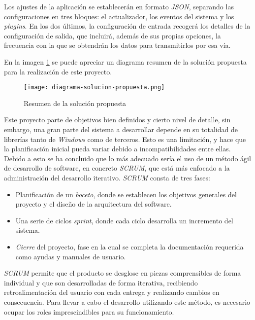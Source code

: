     Los ajustes de la aplicación se establecerán en formato \textit{JSON}, separando las configuraciones en tres bloques: el actualizador, los eventos del sistema y los \textit{plugins}. En los dos últimos, la configuración de entrada recogerá los detalles de la configuración de salida, que incluirá, además de sus propias opciones, la frecuencia con la que se obtendrán los datos para transmitirlos por esa vía.
    
    En la imagen \ref{fig:proposed-solution-diagram} se puede apreciar un diagrama resumen de la solución propuesta para la realización de este proyecto.
    
    \begin{figure}[h!]
    \centering
        \texttt{[image: diagrama-solucion-propuesta.png]}
        \caption{Resumen de la solución propuesta}
        \label{fig:proposed-solution-diagram}
    \end{figure}
    
    Este proyecto parte de objetivos bien definidos y cierto nivel de detalle, sin embargo, una gran parte del sistema a desarrollar depende en su totalidad de librerías tanto de \textit{Windows} como de terceros. Esto es una limitación, y hace que la planificación inicial pueda variar debido a incompatibilidades entre ellas. Debido a esto se ha concluido que lo más adecuado sería el uso de un método ágil de desarrollo de software, en concreto \textit{SCRUM}, que está más enfocado a la administración del desarrollo iterativo. \textit{SCRUM} consta de tres fases:
        
    \begin{itemize}
        \item Planificación de un \textit{boceto}, donde se establecen los objetivos generales del proyecto y el diseño de la arquitectura del software.
        
        \item Una serie de ciclos \textit{sprint}, donde cada ciclo desarrolla un incremento del sistema.
        
        \item \textit{Cierre} del proyecto, fase en la cual se completa la documentación requerida como ayudas y manuales de usuario.
    \end{itemize}

    \textit{SCRUM} permite que el producto se desglose en piezas comprensibles de forma individual y que son desarrolladas de forma iterativa, recibiendo retroalimentación del usuario con cada entrega y realizando cambios en consecuencia. Para llevar a cabo el desarrollo utilizando este método, es necesario ocupar los roles imprescindibles para su funcionamiento.

